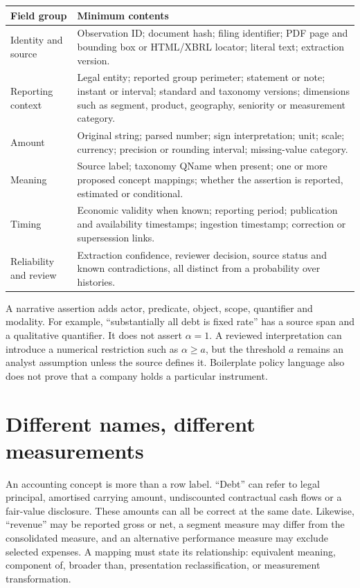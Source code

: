 \begin{longtable}{L{35mm}L{101mm}}
\toprule Field group & Minimum contents\\\midrule\endhead
Identity and source & Observation ID; document hash; filing identifier;
PDF page and bounding box or HTML/XBRL locator; literal text; extraction version.\\
Reporting context & Legal entity; reported group perimeter; statement or note;
instant or interval; standard and taxonomy versions; dimensions such as segment,
product, geography, seniority or measurement category.\\
Amount & Original string; parsed number; sign interpretation; unit; scale;
currency; precision or rounding interval; missing-value category.\\
Meaning & Source label; taxonomy QName when present; one or more proposed
concept mappings; whether the assertion is reported, estimated or conditional.\\
Timing & Economic validity when known; reporting period; publication and
availability timestamps; ingestion timestamp; correction or supersession links.\\
Reliability and review & Extraction confidence, reviewer decision, source
status and known contradictions, all distinct from a probability over histories.\\
\bottomrule
\end{longtable}

A narrative assertion adds actor, predicate, object, scope, quantifier and
modality. For example, ``substantially all debt is fixed rate'' has a source
span and a qualitative quantifier. It does not assert $\alpha=1$. A reviewed
interpretation can introduce a numerical restriction such as
$\alpha\geq a$, but the threshold $a$ remains an analyst assumption unless
the source defines it. Boilerplate policy language also does not prove that a
company holds a particular instrument.

\section{Different names, different measurements}

An accounting concept is more than a row label. ``Debt'' can refer to legal
principal, amortised carrying amount, undiscounted contractual cash flows or a
fair-value disclosure. These amounts can all be correct at the same date.
Likewise, ``revenue'' may be reported gross or net, a segment measure may differ
from the consolidated measure, and an alternative performance measure may
exclude selected expenses. A mapping must state its relationship: equivalent
meaning, component of, broader than, presentation reclassification, or
measurement transformation.

